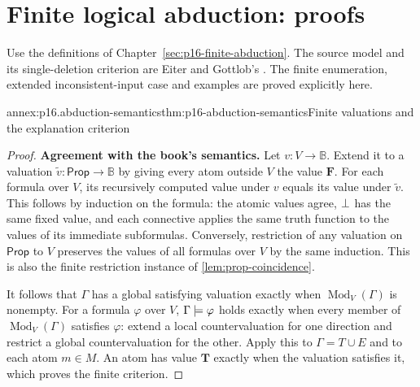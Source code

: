 \section{Finite logical abduction: proofs}
\label{sec:annex-p16-finite-abduction}

Use the definitions of Chapter~\ref{sec:p16-finite-abduction}. The source
model and its single-deletion criterion are Eiter and Gottlob's
\cite[sec.~2, manuscript pp.~9--11]{EiterGottlobAbductionManuscript}.
The finite enumeration, extended inconsistent-input case and examples are
proved explicitly here.

\begin{annexitem}{annex:p16.abduction-semantics}{thm:p16-abduction-semantics}{Finite valuations and the explanation criterion}
\begin{proof}
\textbf{Agreement with the book's semantics.}\enspace
Let \(v:V\to\mathbb{B}\). Extend it to a valuation
\(\widetilde v:\mathsf{Prop}\to\mathbb{B}\) by giving every atom outside \(V\)
the value \(\mathbf{F}\). For each formula over \(V\), its recursively
computed value under \(v\) equals its value under \(\widetilde v\).
This follows by induction on the formula: the atomic values agree,
\(\bot\) has the same fixed value, and each connective applies the
same truth function to the values of its immediate subformulas. Conversely,
restriction of any valuation on \(\mathsf{Prop}\) to \(V\) preserves the
values of all formulas over \(V\) by the same induction. This is also
the finite restriction instance of \cref{lem:prop-coincidence}.

It follows that \(\Gamma\) has a global satisfying valuation exactly
when \(\operatorname{Mod}_V(\Gamma)\) is nonempty. For a formula
\(\varphi\) over \(V\), \(\Gamma\models\varphi\) holds
exactly when every member of \(\operatorname{Mod}_V(\Gamma)\)
satisfies \(\varphi\): extend a local countervaluation for one
direction and restrict a global countervaluation for the other. Apply
this to \(\Gamma=T\cup E\) and to each atom \(m\in M\).
An atom has value \(\mathbf{T}\) exactly when the valuation satisfies it,
which proves the finite criterion.


\end{proof}
\end{annexitem}
